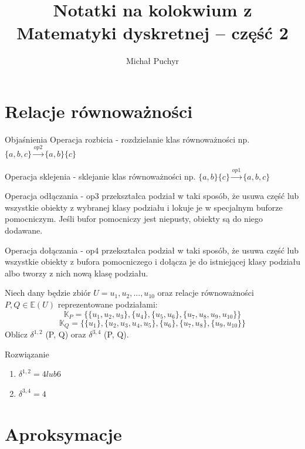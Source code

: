 \documentclass[12pt]{article}
\author{Michał Puchyr}
\date{}
\title{Notatki na kolokwium z Matematyki dyskretnej -- część 2}
\begin{document}
\maketitle

\section{Relacje równoważności}

\begin{tw}{Objaśnienia}
    Operacja rozbicia - rozdzielanie klas równoważności np. $ \{a,b,c\} \overset{op2}{\to} \{a,b\} \{c\} $
    
    Operacja sklejenia - sklejanie klas równoważności np. $ \{ a, b \} \{c\} \overset{op1}{\to} \{a,b,c\} $
    \medskip
    
    Operacja odłączania - op3 przekształca podział w taki sposób, że usuwa część lub wszystkie obiekty z wybranej klasy podziału i lokuje
    je w specjalnym buforze pomocniczym. Jeśli bufor pomocniczy jest niepusty, obiekty są do niego dodawane.
    \medskip

    Operacja dołączania - op4 przekształca podział w taki sposób, że usuwa część lub wszystkie obiekty z bufora pomocniczego i dołącza
    je do istniejącej klasy podziału albo tworzy z nich nową klasę podziału.
\end{tw}

\begin{przyklad}
    Niech dany będzie zbiór $U = {u_1, u_2, ... , u_{10}}$ oraz relacje równoważności $P, Q \in \mathbb{E}(U)$
    reprezentowane podziałami:
    \[\mathbb{K}_P = \{\{u_1, u_2, u_3\}, \{u_4\}, \{u_5, u_6\}, \{u_7, u_8, u_9, u_{10}\}\}\]
    \[\mathbb{K}_Q = \{\{u_1\}, \{u_2, u_3, u_4, u_5\}, \{u_6\}, \{u_7, u_8\}, \{u_9, u_{10}\}\} \]
    Oblicz $\delta^{1,2}$ (P, Q) oraz $\delta^{3,4}$ (P, Q).

    Rozwiązanie
        \begin{enumerate}
            \item $\delta^{1,2} = 4 lub 6$
            \item $\delta^{3,4} = 4$
        \end{enumerate}
    
\end{przyklad}

\section{Aproksymacje}
\end{document}

